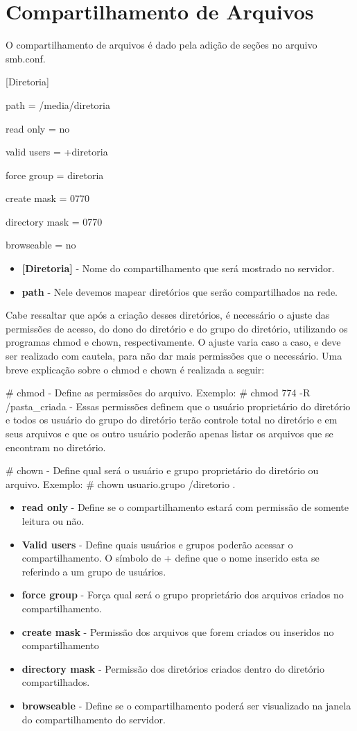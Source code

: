 \section{Compartilhamento de Arquivos}

O compartilhamento de arquivos é dado pela adição de seções no arquivo smb.conf.

[Diretoria]

path = /media/diretoria

read only = no

valid users = +diretoria

force group = diretoria

create mask = 0770

directory mask = 0770

browseable = no

\begin{itemize}
	\item \textbf{[Diretoria]} - Nome do compartilhamento que será mostrado no servidor.
	\item \textbf{path} - Nele devemos mapear diretórios que serão compartilhados na rede. 
\end{itemize}

	Cabe ressaltar que após a criação desses diretórios, é necessário o ajuste das permissões de acesso, do dono do diretório e do grupo do diretório, utilizando os programas chmod e chown, respectivamente. O ajuste varia caso a caso, e deve ser realizado com cautela, para não dar mais permissões que o necessário. Uma breve explicação sobre o chmod e chown é realizada a seguir:

\# chmod - Define as permissões do arquivo. Exemplo: \# chmod 774 -R /pasta\_criada - Essas permissões definem que o usuário proprietário do diretório e todos os usuário do grupo do diretório terão controle total no diretório e em seus arquivos e que os outro usuário poderão apenas listar os arquivos que se encontram no diretório.

\# chown - Define qual será o usuário e grupo proprietário do diretório ou arquivo. Exemplo: \# chown usuario.grupo /diretorio .

\begin{itemize}
	\item \textbf{read only} - Define se o compartilhamento estará com permissão de somente leitura ou não.
	\item \textbf{Valid users} - Define quais usuários e grupos poderão acessar o compartilhamento. O símbolo de + define que o nome inserido esta se referindo a um grupo de usuários.
	\item \textbf{force group} - Força qual será o grupo proprietário dos arquivos criados no compartilhamento.
	\item \textbf{create mask} - Permissão dos arquivos que forem criados ou inseridos no compartilhamento
	\item \textbf{directory mask} - Permissão dos diretórios criados dentro do diretório compartilhados.
	\item \textbf{browseable} - Define se o compartilhamento poderá ser visualizado na janela do compartilhamento do servidor.
\end{itemize}

